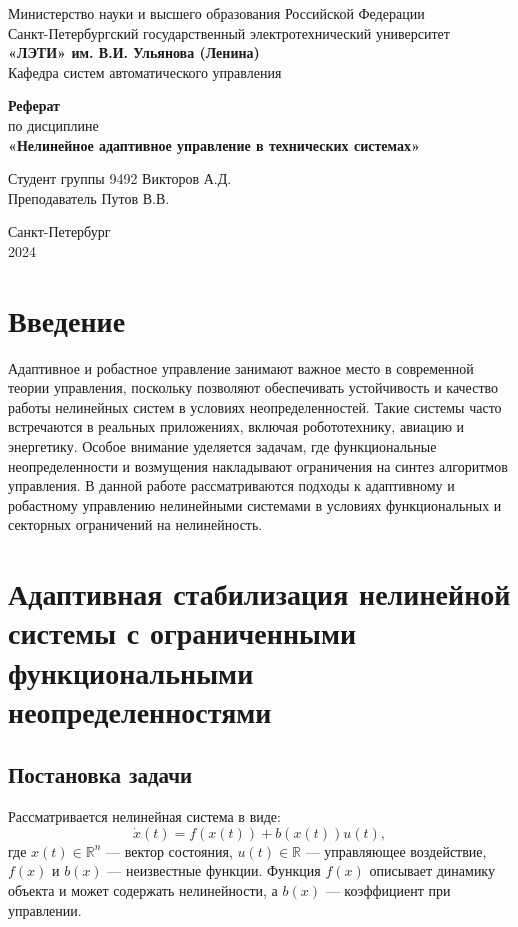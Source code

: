 \documentclass[a4paper,14pt]{extarticle} %
\begin{document}
\begin{titlepage}
    \begin{center}
        \large
        Министерство науки и высшего образования Российской Федерации \\
        Санкт-Петербургский государственный электротехнический университет \\
        \textbf{«ЛЭТИ» им. В.И. Ульянова (Ленина)} \\
        Кафедра систем автоматического управления

        \vfill

        \textbf{Реферат} \\
        по дисциплине \\
        \textbf{«Нелинейное адаптивное управление в технических системах»}

        \vfill

        Студент группы 9492 \hfill Викторов А.Д. \\
        Преподаватель \hfill Путов В.В.

        \vfill
        Санкт-Петербург \\
        2024
    \end{center}
\end{titlepage}

\setcounter{page}{2}
\tableofcontents

\newpage
\section*{Введение}
Адаптивное и робастное управление занимают важное место в современной теории управления, поскольку позволяют обеспечивать устойчивость и качество работы нелинейных систем в условиях неопределенностей. Такие системы часто встречаются в реальных приложениях, включая робототехнику, авиацию и энергетику. Особое внимание уделяется задачам, где функциональные неопределенности и возмущения накладывают ограничения на синтез алгоритмов управления. В данной работе рассматриваются подходы к адаптивному и робастному управлению нелинейными системами в условиях функциональных и секторных ограничений на нелинейность.

\newpage
\section{Адаптивная стабилизация нелинейной системы с ограниченными функциональными неопределенностями}
\subsection*{Постановка задачи}
Рассматривается нелинейная система в виде:
\begin{equation}
\dot{x}(t) = f(x(t)) + b(x(t))u(t),
\end{equation}
где $x(t) \in \mathbb{R}^n$ — вектор состояния, $u(t) \in \mathbb{R}$ — управляющее воздействие, $f(x)$ и $b(x)$ — неизвестные функции. Функция $f(x)$ описывает динамику объекта и может содержать нелинейности, а $b(x)$ — коэффициент при управлении. 
\end{document}
